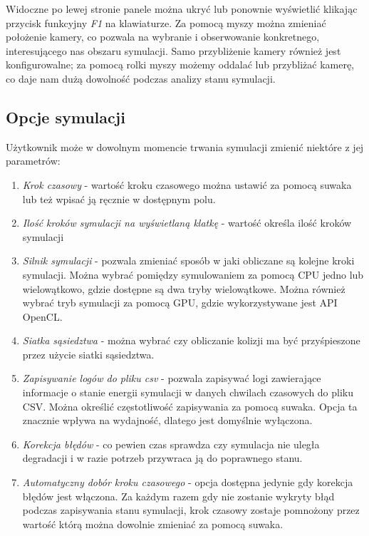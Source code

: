 \documentclass[12pt, letterpaper]{report}
\begin{document}
    Widoczne po lewej stronie panele można ukryć lub ponownie wyświetlić klikając
    przycisk funkcyjny \emph{F1} na klawiaturze. Za pomocą myszy można zmieniać położenie kamery, 
    co pozwala na wybranie i obserwowanie konkretnego, interesującego nas obszaru symulacji.
    Samo przybliżenie kamery również jest konfigurowalne; za pomocą rolki myszy możemy oddalać 
    lub przybliżać kamerę, co daje nam dużą dowolność podczas analizy stanu symulacji.

    \subsection{Opcje symulacji}
    Użytkownik może w dowolnym momencie trwania symulacji zmienić niektóre z jej parametrów:
    \begin{enumerate}
        \item \emph{Krok czasowy} - wartość kroku czasowego można ustawić za pomocą suwaka lub też wpisać
        ją ręcznie w dostępnym polu.

        \item \emph{Ilość kroków symulacji na wyświetlaną klatkę} - wartość określa ilość kroków symulacji

        \item \emph{Silnik symulacji} - pozwala zmieniać sposób w jaki obliczane są kolejne kroki symulacji.
        Można wybrać pomiędzy symulowaniem za pomocą CPU jedno lub wielowątkowo, gdzie dostępne są dwa
        tryby wielowątkowe. Można również wybrać tryb symulacji za pomocą GPU, gdzie wykorzystywane jest API OpenCL.

        \item \emph{Siatka sąsiedztwa} - można wybrać czy obliczanie kolizji ma być przyśpieszone przez użycie
        siatki sąsiedztwa.

        \item \emph{Zapisywanie logów do pliku csv} - pozwala zapisywać logi zawierające informacje o stanie
        energii symulacji w danych chwilach czasowych do pliku CSV. Można określić częstotliwość zapisywania
        za pomocą suwaka. Opcja ta znacznie wpływa na wydajność, dlatego jest domyślnie wyłączona.

        \item \emph{Korekcja błędów} - co pewien czas sprawdza czy symulacja nie uległa degradacji i 
        w razie potrzeb przywraca ją do poprawnego stanu.

        \item \emph{Automatyczny dobór kroku czasowego} - opcja dostępna jedynie gdy korekcja błędów jest włączona.
        Za każdym razem gdy nie zostanie wykryty błąd podczas zapisywania stanu symulacji, krok czasowy zostaje
        pomnożony przez wartość którą można dowolnie zmieniać za pomocą suwaka.
        
    \end{enumerate}
\end{document}
